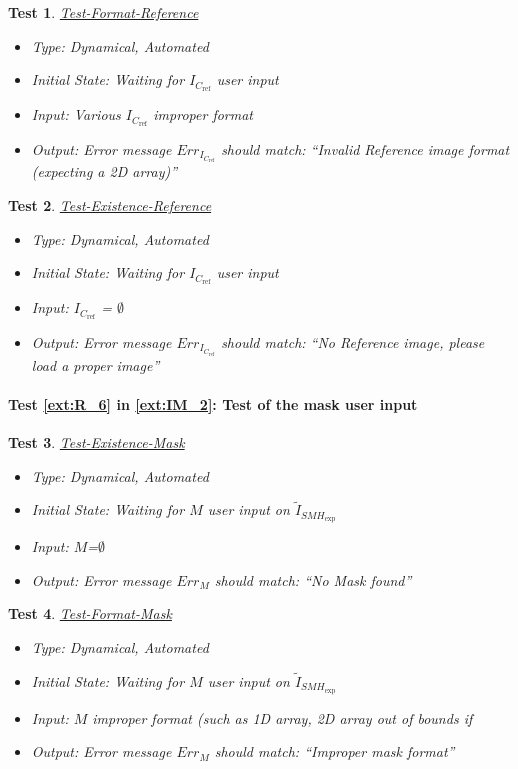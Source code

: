 \documentclass[12pt, titlepage]{article}
\newtheorem{Test}{Test}
\begin{document}
\begin{Test}\normalfont\underline{Test-Format-Reference}
\label{Test-Format-Reference}
\begin{itemize}
\item Type: Dynamical, Automated
\item Initial State: Waiting for $I_{C_{\text{ref}}}$ user input
\item Input: Various $I_{C_{\text{ref}}}$ improper format
\item Output: Error message $Err_{I_{C_{\text{ref}}}}$ should match: \enquote{Invalid Reference image format (expecting a 2D array)}
\end{itemize}
\end{Test}

\begin{Test}\normalfont\underline{Test-Existence-Reference}
\label{Test-Existence-Reference}
\begin{itemize}
\item Type: Dynamical, Automated
\item Initial State: Waiting for $I_{C_{\text{ref}}}$ user input
\item Input: $I_{C_{\text{ref}}}$ = $\emptyset$
\item Output: Error message $Err_{I_{C_{\text{ref}}}}$ should match: \enquote{No Reference image, please load a proper image}
\end{itemize}
\end{Test}


\paragraph{Test \cref{ext:R_6} in \cref{ext:IM_2}: Test of the mask user input}

\begin{Test}\normalfont\underline{Test-Existence-Mask}
\label{Test-Existence-Mask}
\begin{itemize}
\item Type: Dynamical, Automated
\item Initial State: Waiting for $M$ user input on $\widetilde{I}_{\mathit{SMH}_{\text{exp}}}$
\item Input: $M$=$\emptyset$
\item Output:  Error message $Err_{M}$ should match: \enquote{No Mask found}
\end{itemize}
\end{Test}

\begin{Test}\normalfont\underline{Test-Format-Mask}
\label{Test-Format-Mask}
\begin{itemize}
\item Type: Dynamical, Automated
\item Initial State: Waiting for $M$ user input on $\widetilde{I}_{\mathit{SMH}_{\text{exp}}}$
\item Input: $M$ improper format (such as 1D array, 2D array out of bounds if  
\item Output:  Error message $Err_{M}$ should match: \enquote{Improper mask format}
\end{itemize}
\end{Test}
\end{document}
